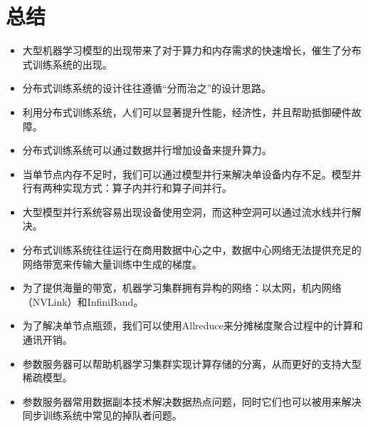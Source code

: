 \documentclass[letterpaper,10pt,english]{sphinxmanual}
\begin{document}
\section{总结}
\label{\detokenize{chapter_distributed_training/summary:id1}}\label{\detokenize{chapter_distributed_training/summary::doc}}\begin{itemize}
\item {} 
\sphinxAtStartPar
大型机器学习模型的出现带来了对于算力和内存需求的快速增长，催生了分布式训练系统的出现。

\item {} 
\sphinxAtStartPar
分布式训练系统的设计往往遵循“分而治之”的设计思路。

\item {} 
\sphinxAtStartPar
利用分布式训练系统，人们可以显著提升性能，经济性，并且帮助抵御硬件故障。

\item {} 
\sphinxAtStartPar
分布式训练系统可以通过数据并行增加设备来提升算力。

\item {} 
\sphinxAtStartPar
当单节点内存不足时，我们可以通过模型并行来解决单设备内存不足。模型并行有两种实现方式：算子内并行和算子间并行。

\item {} 
\sphinxAtStartPar
大型模型并行系统容易出现设备使用空洞，而这种空洞可以通过流水线并行解决。

\item {} 
\sphinxAtStartPar
分布式训练系统往往运行在商用数据中心之中，数据中心网络无法提供充足的网络带宽来传输大量训练中生成的梯度。

\item {} 
\sphinxAtStartPar
为了提供海量的带宽，机器学习集群拥有异构的网络：以太网，机内网络（NVLink）和InfiniBand。

\item {} 
\sphinxAtStartPar
为了解决单节点瓶颈，我们可以使用Allreduce来分摊梯度聚合过程中的计算和通讯开销。

\item {} 
\sphinxAtStartPar
参数服务器可以帮助机器学习集群实现计算\sphinxhyphen{}存储的分离，从而更好的支持大型稀疏模型。

\item {} 
\sphinxAtStartPar
参数服务器常用数据副本技术解决数据热点问题，同时它们也可以被用来解决同步训练系统中常见的掉队者问题。

\end{itemize}
\end{document}
